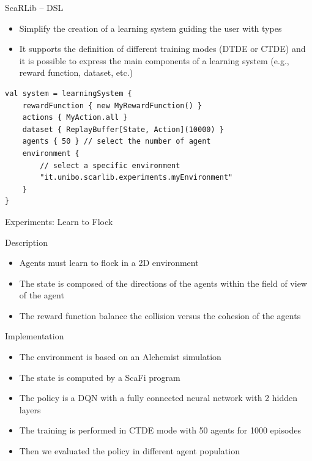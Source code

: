 \documentclass[presentation, 9pt]{beamer}\mode<presentation>{\usetheme{AMSBolognaFC}}
\begin{document}
\begin{frame}[fragile]{ScaRLib -- DSL}
\begin{itemize}
	\item Simplify the creation of a learning system guiding the user with types
	\item It supports the definition of different training modes (DTDE or CTDE) and it is possible to express the main components of a learning system (e.g., reward function, dataset, etc.)
\end{itemize}
\centering
\begin{verbatim}
val system = learningSystem {
	rewardFunction { new MyRewardFunction() }
	actions { MyAction.all }
	dataset { ReplayBuffer[State, Action](10000) }
	agents { 50 } // select the number of agent
	environment {
		// select a specific environment
		"it.unibo.scarlib.experiments.myEnvironment"
	}
}
\end{verbatim}
\end{frame}
\begin{frame}{Experiments: Learn to Flock}
\begin{exampleblock}{Description}
	\begin{itemize}
		\item Agents must learn to flock in a 2D environment
		\item The state is composed of the directions of the agents within the field of view of the agent
		\item The reward function balance the collision versus the cohesion of the agents
	\end{itemize}
\end{exampleblock}
\begin{alertblock}{Implementation}
	\begin{itemize}
		\item The environment is based on an Alchemist simulation
		\item The state is computed by a ScaFi program
		\item The policy is a DQN with a fully connected neural network with 2 hidden layers
		\item The training is performed in CTDE mode with 50 agents for 1000 episodes
		\item Then we evaluated the policy in different agent population
	\end{itemize}
\end{alertblock}
\end{frame}
\end{document}
